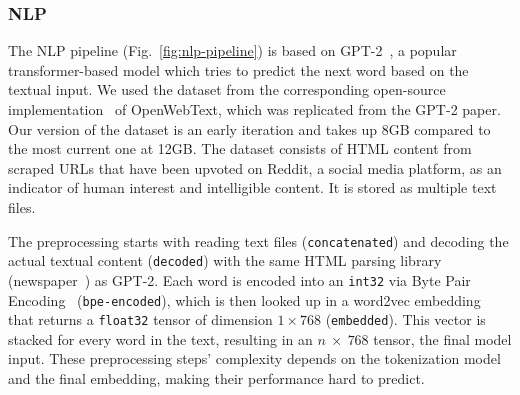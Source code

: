 \subsubsection{NLP}

The NLP pipeline  (Fig.~\ref{fig:nlp-pipeline}) is based on GPT-2~\cite{radford2019better}, a popular transformer-based model which tries to predict the next word based on the textual input.
We used the dataset from the corresponding open-source implementation~\cite{Gokaslan2019OpenWeb} of OpenWebText, which was replicated from the GPT-2 paper.
Our version of the dataset is an early iteration and takes up 8\:GB compared to the most current one at 12\:GB.
The dataset consists of HTML content from scraped URLs that have been upvoted on Reddit, a social media platform, as an indicator of human interest and intelligible content. It is stored as multiple text files.

The preprocessing starts with reading text files ({\color{diff}\texttt{concatenated}}) and decoding the actual textual content ({\color{diff}\texttt{decoded}}) with the same HTML parsing library (newspaper~\cite{newspaper2020}) as GPT-2.
Each word is encoded into an \texttt{int32} via Byte Pair Encoding~\cite{DBLP:journals/corr/SennrichHB15} ({\color{diff}\texttt{bpe-encoded}}), which is then looked up in a word2vec embedding~\cite{mikolov2013efficient} that returns a \texttt{float32} tensor of dimension $1\times768$ ({\color{diff}\texttt{embedded}}).
This vector is stacked for every word in the text, resulting in an $n\:\times\:768$ tensor, the final model input.
These preprocessing steps' complexity depends on the tokenization model and the final embedding, making their performance hard to predict.

